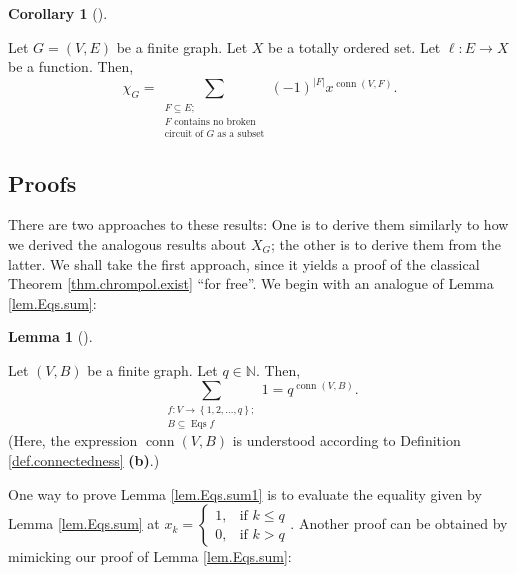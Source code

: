 \documentclass[numbers=enddot,12pt,final,onecolumn,notitlepage]{scrartcl}%
\theoremstyle{definition}
\newtheorem{lem}[theo]{Lemma}
\newenvironment{lemma}[1][]
{\begin{lem}[#1]\begin{leftbar}}
{\end{leftbar}\end{lem}}
\newtheorem{coro}[theo]{Corollary}
\newenvironment{corollary}[1][]
{\begin{coro}[#1]\begin{leftbar}}
{\end{leftbar}\end{coro}}
\let\sumnonlimits\sum
\renewcommand{\sum}{\sumnonlimits\limits}
\begin{document}
\begin{corollary}
\label{cor.chrompol.NBC}Let $G=\left(  V,E\right)  $ be a finite graph. Let
$X$ be a totally ordered set. Let $\ell:E\rightarrow X$ be a function. Then,%
\[
\chi_{G}=\sum_{\substack{F\subseteq E;\\F\text{ contains no broken}%
\\\text{circuit of }G\text{ as a subset}}}\left(  -1\right)  ^{\left\vert
F\right\vert }x^{\operatorname*{conn}\left(  V,F\right)  }.
\]

\end{corollary}

\subsection{Proofs}

There are two approaches to these results: One is to derive them similarly to
how we derived the analogous results about $X_{G}$; the other is to derive
them from the latter. We shall take the first approach, since it yields a
proof of the classical Theorem \ref{thm.chrompol.exist} \textquotedblleft for
free\textquotedblright. We begin with an analogue of Lemma \ref{lem.Eqs.sum}:

\begin{lemma}
\label{lem.Eqs.sum1}Let $\left(  V,B\right)  $ be a finite graph. Let
$q\in\mathbb{N}$. Then,%
\[
\sum_{\substack{f:V\rightarrow\left\{  1,2,\ldots,q\right\}  ;\\B\subseteq
\operatorname*{Eqs}f}}1=q^{\operatorname*{conn}\left(  V,B\right)  }.
\]
(Here, the expression $\operatorname*{conn}\left(  V,B\right)  $ is understood
according to Definition \ref{def.connectedness} \textbf{(b)}.)
\end{lemma}

One way to prove Lemma \ref{lem.Eqs.sum1} is to evaluate the equality given by
Lemma \ref{lem.Eqs.sum} at $x_{k}=%
\begin{cases}
1, & \text{if }k\leq q\\
0, & \text{if }k>q
\end{cases}
$. Another proof can be obtained by mimicking our proof of Lemma
\ref{lem.Eqs.sum}:
\end{document}
